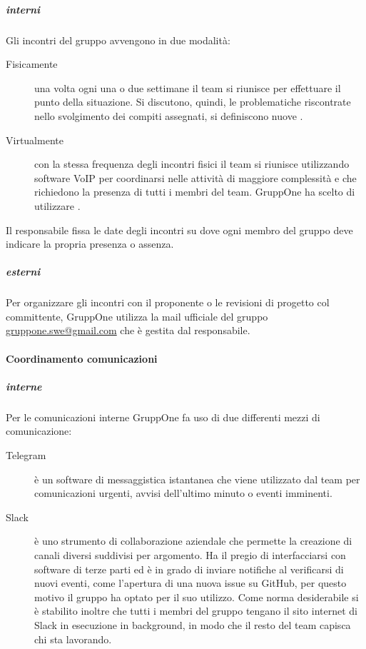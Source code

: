 \documentclass[../../norme-di-progetto.tex]{subfiles}
\begin{document}
\subparagraph{interni}%
\label{subp:coordinamento_incontri/interni}
Gli incontri del gruppo avvengono in due modalità:
\begin{description}
  \item [Fisicamente] una volta ogni una o due settimane il team si riunisce per effettuare il punto della situazione. Si discutono, quindi, le problematiche riscontrate nello svolgimento dei compiti assegnati, si definiscono nuove .
  \item [Virtualmente] con la stessa frequenza degli incontri fisici il team si riunisce utilizzando software VoIP per coordinarsi nelle attività di maggiore complessità e che richiedono la presenza di tutti i membri del team. GruppOne ha scelto di utilizzare .
\end{description}
Il responsabile fissa le date degli incontri su  dove ogni membro del gruppo deve indicare la propria presenza o assenza.

\subparagraph{esterni}%
\label{subp:coordinamento_incontri/esterni}
Per organizzare gli incontri con il proponente o le revisioni di progetto col committente, GruppOne utilizza la mail ufficiale del gruppo \href{gruppone.swe@gmail.com}{gruppone.swe@gmail.com} che è gestita dal responsabile.

\paragraph{Coordinamento comunicazioni}%
\label{par:coordinamento_comunicazioni}

\subparagraph{interne}%
\label{subp:coordinamento_comunicazioni/interne}
Per le comunicazioni interne GruppOne fa uso di due differenti mezzi di comunicazione:
\begin{description}
  \item [Telegram] è un software di messaggistica istantanea che viene utilizzato dal team per comunicazioni urgenti, avvisi dell'ultimo minuto o eventi imminenti.
  \item [Slack] è uno strumento di collaborazione aziendale che permette la creazione di canali diversi suddivisi per argomento. Ha il pregio di interfacciarsi con software di terze parti ed è in grado di inviare notifiche al verificarsi di nuovi eventi, come l'apertura di una nuova issue su GitHub, per questo motivo il gruppo ha optato per il suo utilizzo. Come norma desiderabile si è stabilito inoltre che tutti i membri del gruppo tengano il sito internet di Slack in esecuzione in background, in modo che il resto del team capisca chi sta lavorando.
\end{description}
\end{document}
